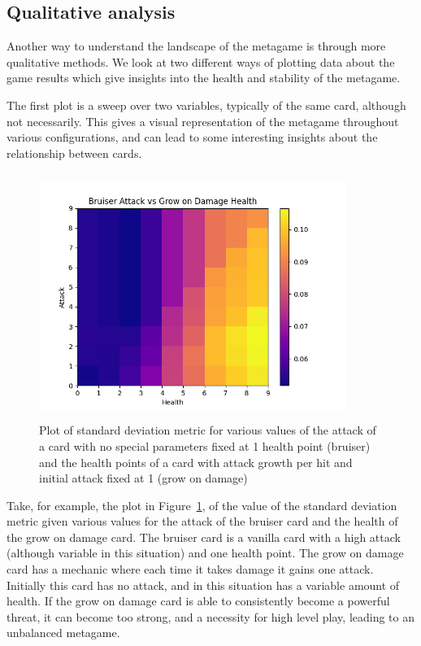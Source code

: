 \subsection{Qualitative analysis}

Another way to understand the landscape of the metagame is through more qualitative methods. We look at two different ways of plotting data about the game results which give insights into the health and stability of the metagame. 

The first plot is a sweep over two variables, typically of the same card, although not necessarily. This gives a visual representation of the metagame throughout various configurations, and can lead to some interesting insights about the relationship between cards.

\begin{figure}[t]
	\includegraphics[width=10cm, height=8cm]{bruiser_vs_grow} 
	\caption{Plot of standard deviation metric for various values of the attack of a card with no special parameters fixed at 1 health point (bruiser) and the health points of a card with attack growth per hit and initial attack fixed at 1 (grow on damage)}
	\label{fig:bruiser_vs_grow}
\end{figure}

Take, for example, the plot in Figure~\ref{fig:bruiser_vs_grow}, of the value of the standard deviation metric given various values for the attack of the bruiser card and the health of the grow on damage card. The bruiser card is a vanilla card with a high attack (although variable in this situation) and one health point. The grow on damage card has a mechanic where each time it takes damage it gains one attack. Initially this card has no attack, and in this situation has a variable amount of health. If the grow on damage card is able to consistently become a powerful threat, it can become too strong, and a necessity for high level play, leading to an unbalanced metagame.

